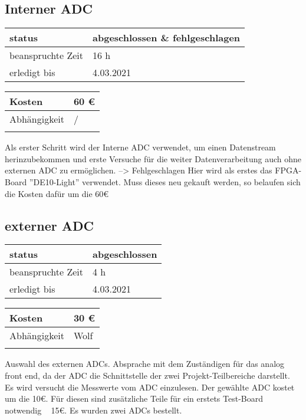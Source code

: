 \documentclass{scrartcl}
\begin{document}
\subsection{Interner ADC}
\begin{tabular}[h]{|l|l|} %
	\hline
	status & abgeschlossen \& fehlgeschlagen\\
	\hline
	beanspruchte Zeit & 16 h\\
	\hline
	erledigt bis & 4.03.2021 \\
	\hline
\end{tabular}
\begin{tabular}[h]{|l|l|} %
	\hline
	Kosten & 60 €\\
	\hline
	Abhängigkeit & /\\
	\hline
	 &  \\
	\hline
\end{tabular}
Als erster Schritt wird der Interne ADC verwendet, um einen Datenstream herinzubekommen und erste Versuche für die weiter Datenverarbeitung auch ohne externen ADC zu ermöglichen. --> Fehlgeschlagen
Hier wird als erstes das FPGA-Board ''DE10-Light'' verwendet. Muss dieses neu gekauft werden, so belaufen sich die Kosten dafür um die 60€
\subsection{externer ADC}
\begin{tabular}[h]{|l|l|} %
	\hline
	status & abgeschlossen\\
	\hline
	beanspruchte Zeit & 4 h\\
	\hline
	erledigt bis & 4.03.2021 \\
	\hline
\end{tabular}
\begin{tabular}[h]{|l|l|} %
	\hline
	Kosten & 30 €\\
	\hline
	Abhängigkeit & Wolf\\
	\hline
	 &  \\
	\hline
\end{tabular}
Auswahl des externen ADCs. Absprache mit dem Zuständigen für das analog front end, da der ADC die Schnittstelle der zwei Projekt-Teilbereiche darstellt.\\Es wird versucht die Messwerte vom ADC einzulesen. Der gewählte ADC kostet um die 10€. Für diesen sind zusätzliche Teile für ein erstets Test-Board notwendig ~ 15€. Es wurden zwei ADCs bestellt.
\end{document}
